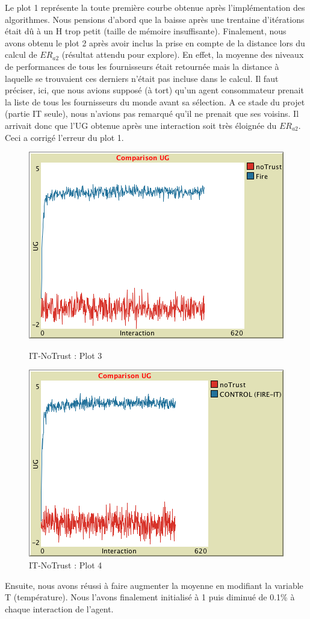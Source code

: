 Le plot 1 représente la toute première courbe obtenue après l'implémentation des algorithmes. Nous pensions d'abord que la baisse après une trentaine d'itérations était dû à un H trop petit (taille de mémoire insuffisante). Finalement, nous avons obtenu le plot 2 après avoir inclus la prise en compte de la distance lors du calcul de $ER_{a2}$ (résultat attendu pour explore\cite{Dilemme}). En effet, la moyenne des niveaux de performances de tous les fournisseurs était retournée mais la distance à laquelle se trouvaient ces derniers n'était pas incluse dans le calcul. Il faut préciser, ici, que nous avions supposé (à tort) qu'un agent consommateur prenait la liste de tous les fournisseurs du monde avant sa sélection. A ce stade du projet (partie IT seule), nous n'avions pas remarqué qu'il ne prenait que ses voisins. Il arrivait donc que l'UG obtenue après une interaction soit très éloignée du $ER_{a2}$. Ceci a corrigé l'erreur du plot 1. 
\begin{figure}[H]
   \begin{minipage}{0.48\textwidth}
     \centering
     \includegraphics[width=.7\linewidth]{images/evolutionIT/IT3.png}
     \caption{IT-NoTrust : Plot 3}\label{Fig:Data1}
   \end{minipage}\hfill
   \begin{minipage}{0.48\textwidth}
     \centering
     \includegraphics[width=.7\linewidth]{images/evolutionIT/IT4.png}
     \caption{IT-NoTrust : Plot 4}\label{Fig:Data2}
   \end{minipage}
\end{figure}

Ensuite, nous avons réussi à faire augmenter la moyenne en modifiant la variable T (température). Nous l'avons finalement initialisé à 1 puis diminué de 0.1\% à chaque interaction de l'agent.